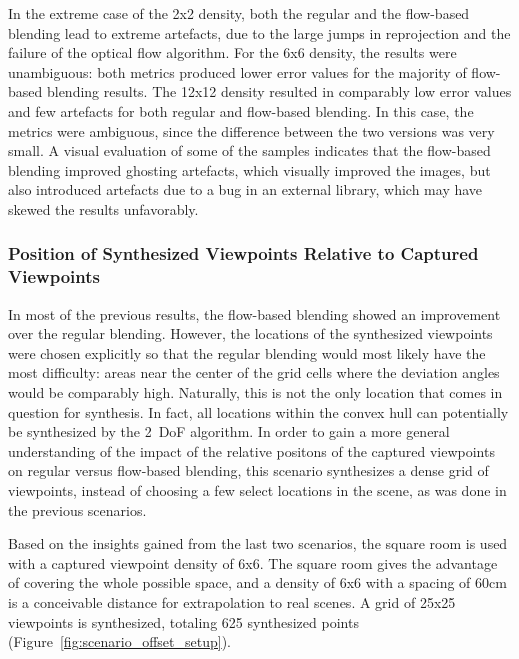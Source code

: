 In the extreme case of the 2x2 density, both the regular and the flow-based blending lead to extreme artefacts, due to the large jumps in reprojection and the failure of the optical flow algorithm.
For the 6x6 density, the results were unambiguous: both metrics produced lower error values for the majority of flow-based blending results.
The 12x12 density resulted in comparably low error values and few artefacts for both regular and flow-based blending. In this case, the metrics were ambiguous, since the difference between the two versions was very small. A visual evaluation of some of the samples indicates that the flow-based blending improved ghosting artefacts, which visually improved the images, but also introduced artefacts due to a bug in an external library, which may have skewed the results unfavorably.















\subsubsection{Position of Synthesized Viewpoints Relative to Captured Viewpoints}
In most of the previous results, the flow-based blending showed an improvement over the regular blending. However, the locations of the synthesized viewpoints were chosen explicitly so that the regular blending would most likely have the most difficulty: areas near the center of the grid cells where the deviation angles would be comparably high. Naturally, this is not the only location that comes in question for synthesis. In fact, all locations within the convex hull can potentially be synthesized by the 2~DoF algorithm. In order to gain a more general understanding of the impact of the relative positons of the captured viewpoints on regular versus flow-based blending, this scenario synthesizes a dense grid of viewpoints, instead of choosing a few select locations in the scene, as was done in the previous scenarios.

Based on the insights gained from the last two scenarios, the square room is used with a captured viewpoint density of 6x6. The square room gives the advantage of covering the whole possible space, and a density of 6x6 with a spacing of 60cm is a conceivable distance for extrapolation to real scenes. A grid of 25x25 viewpoints is synthesized, totaling 625 synthesized points (Figure~\ref{fig:scenario_offset_setup}).

